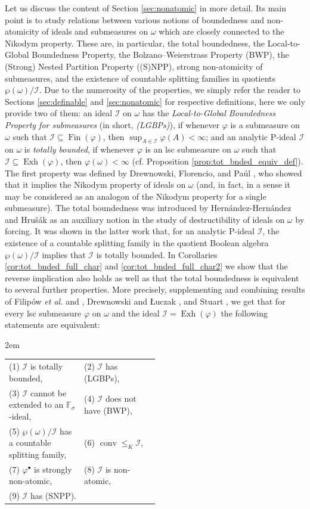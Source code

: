 \documentclass[a4paper,11pt,fleqn]{amsart}
\theoremstyle{definition}
\theoremstyle{remark}
\numberwithin{equation}{section}
\newcommand{\N}{\mathbb{N}}
\newcommand{\F}{\mathbb{F}}
\newcommand{\iI}{\mathcal{I}}
\DeclareMathOperator{\conv}{{conv}}
\DeclareMathOperator{\exh}{Exh}
\DeclareMathOperator{\fin}{Fin}
\newcommand{\sub}{\subseteq}
\newcommand{\wo}{{\wp(\omega)}}%
\begin{document}
Let us discuss the content of Section \ref{sec:nonatomic} in more detail. Its main point is to study relations between various notions of boundedness and non-atomicity of ideals and submeasures on $\omega$ which are closely connected to the Nikodym property. These are, in particular, the total boundedness, the Local-to-Global Boundedness Property, the Bolzano--Weierstrass Property (BWP), the (Strong) Nested Partition Property ((S)NPP), strong non-atomicity of submeasures, and the existence of countable splitting families in quotients $\wo/\iI$. Due to the numerosity of the properties, we simply refer the reader to Sections \ref{sec:definable} and \ref{sec:nonatomic} for respective definitions, here we only provide two of them: an ideal $\iI$ on $\omega$ has the \textit{Local-to-Global Boundedness Property for submeasures} (in short, \textit{(LGBPs)}), if whenever $\varphi$ is a submeasure on $\omega$ such that $\iI\sub\fin(\varphi)$, then $\sup_{A\in\iI}\varphi(A)<\infty$; and an analytic P-ideal $\iI$ on $\omega$ is \textit{totally bounded}, if whenever $\varphi$ is an lsc submeasure on $\omega$ such that $\iI\sub\exh(\varphi)$, then $\varphi(\omega)<\infty$ (cf. Proposition \ref{prop:tot_bnded_equiv_def}). The first property was defined by Drewnowski, Florencio, and Pa\'ul \cite{DFP96}, who showed that it implies the Nikodym property of ideals on $\omega$ (and, in fact, in a sense it may be considered as an analogon of the Nikodym property for a single submeasure). The total boundedness was introduced by Hern\'andez-Hern\'andez and Hru\v{s}\'ak \cite{HHH07} as an auxiliary notion in the study of destructibility of ideals on $\omega$ by forcing. It was shown in the latter work that, for an analytic P-ideal $\iI$, the existence of a countable splitting family in the quotient Boolean algebra $\wo/\iI$ implies that $\iI$ is totally bounded. In Corollaries \ref{cor:tot_bnded_full_char} and \ref{cor:tot_bnded_full_char2} we show that the reverse implication also holds as well as that the total boundedness is equivalent to several further properties. More precisely, supplementing and combining results of Filip\'ow \textit{et al.} \cite{BFMS13} and \cite{FMRS07}, Drewnowski and \L uczak \cite{DL08ii}, and Stuart \cite{Stu07}, we get that for every lsc submeasure $\varphi$ on $\omega$ and the ideal $\iI=\exh(\varphi)$ the following statements are equivalent:
\vspace{1mm}
\begin{addmargin}[1em]{2em}%
\begin{tabular}{l p{0.5\linewidth}}
(1) $\iI$ is totally bounded, & (2) $\iI$ has (LGBPs),\\
(3) $\iI$ cannot be extended to an $\F_\sigma$-ideal, & (4) $\iI$ does not have (BWP),\\
(5) $\wo/\iI$ has a countable splitting family, & (6) $\conv\le_K\iI$,\\
(7) $\varphi^\bullet$ is strongly non-atomic, & (8) $\iI$ is non-atomic,\\
\multicolumn{2}{l}{(9) $\iI$ has (SNPP).}\\
\end{tabular}
\end{addmargin}
\end{document}

